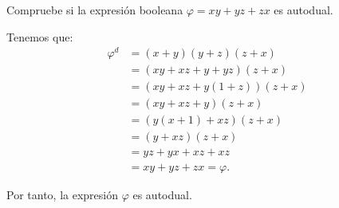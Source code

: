 \begin{ejercicio}
    Compruebe si la expresión booleana $\varphi=xy+yz+zx$ es autodual.

    Tenemos que:
    \begin{align*}
        \varphi^d &= (x+y)(y+z)(z+x)\\
        &= (xy + xz + y + yz)(z + x)\\
        &= (xy + xz + y(1+z))(z + x)\\
        &= (xy + xz + y)(z + x)\\
        &= (y(x+1) + xz)(z + x)\\
        &= (y + xz)(z + x)\\
        &= yz + yx + xz + xz\\
        &= xy + yz + zx = \varphi.
    \end{align*}

    Por tanto, la expresión $\varphi$ es autodual.
\end{ejercicio}
